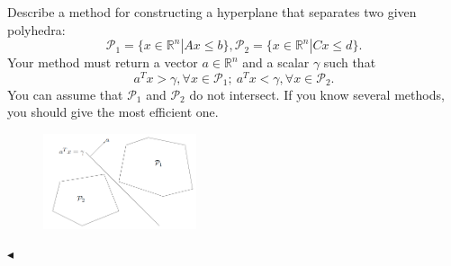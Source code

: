 \documentclass[11pt]{article}
\newenvironment{problem}[2][Problem]{\begin{trivlist}
\item[\hskip \labelsep{\bfseries#1}\hskip\labelsep{\bfseries#2.}]}{\hfill$\blacktriangleleft$\end{trivlist}}
\begin{document}
\begin{problem}{4. (Construct a Hyperplane)}
    Describe a method for constructing a hyperplane that separates two given polyhedra:
    \begin{equation*}
    \mathcal{P}_1 = \{x\in \mathbb{R}^n | Ax \leqslant b\}, \mathcal{P}_2 = \{x\in \mathbb{R}^n | Cx \leqslant d\}.
    \end{equation*}
    Your method must return a vector $a\in \mathbb{R}^n$ and a scalar $\gamma$ such that
    \begin{equation*}
        a^T x > \gamma, \forall x\in \mathcal{P}_1;\ a^T x < \gamma, \forall x\in \mathcal{P}_2.
    \end{equation*}
    You can assume that $\mathcal{P}_1$ and $\mathcal{P}_2$ do not intersect. If you know several methods, you should give the most efficient one.
    
    \begin{figure}[H] 
        \centering
        \includegraphics[width=0.4\textwidth]{figs/plane.png}
    \end{figure}
\end{problem}
\end{document}
